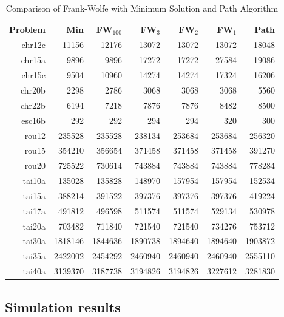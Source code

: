 \begin{table}[htdp]
\caption{Comparison of Frank-Wolfe with Minimum Solution and Path Algorithm}
\begin{center}
\begin{tabular}{|r|r||r|r|r|r|r|}
\hline
Problem  &   Min    & FW$_{100}$&FW$_{3}$&FW$_{2}$&FW$_{1}$&Path\\
\hline
    chr12c &   11156 &   12176 &   13072 &   13072 &   13072 &   18048\\
    chr15a &    9896 &    9896 &   17272 &   17272 &   27584 &   19086\\
    chr15c &    9504 &   10960 &   14274 &   14274 &   17324 &   16206\\
    chr20b &    2298 &    2786 &    3068 &    3068 &    3068 &    5560\\
    chr22b &    6194 &    7218 &    7876 &    7876 &    8482 &    8500\\
    esc16b &     292 &     292 &     294 &     294 &     320 &     300\\
     rou12 &  235528 &  235528 &  238134 &  253684 &  253684 &  256320\\
     rou15 &  354210 &  356654 &  371458 &  371458 &  371458 &  391270\\
     rou20 &  725522 &  730614 &  743884 &  743884 &  743884 &  778284\\
    tai10a &  135028 &  135828 &  148970 &  157954 &  157954 &  152534\\
    tai15a &  388214 &  391522 &  397376 &  397376 &  397376 &  419224\\
    tai17a &  491812 &  496598 &  511574 &  511574 &  529134 &  530978\\
    tai20a &  703482 &  711840 &  721540 &  721540 &  734276 &  753712\\
    tai30a & 1818146 & 1844636 & 1890738 & 1894640 & 1894640 & 1903872\\
    tai35a & 2422002 & 2454292 & 2460940 & 2460940 & 2460940 & 2555110\\
    tai40a & 3139370 & 3187738 & 3194826 & 3194826 & 3227612 & 3281830\\
    \hline
\end{tabular}
\end{center}
\label{tab:fwpath}
\end{table}%


\subsection{Simulation results} %
\label{sub:simulation_results}

